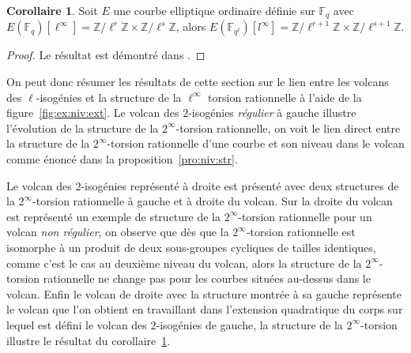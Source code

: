\documentclass[10pt,a4paper]{book}
\theoremstyle{plain}
\theoremstyle{definition}
\theoremstyle{definition}
\theoremstyle{definition}
\newtheorem{cor}[thm]{Corollaire}
\theoremstyle{definition}
\theoremstyle{definition}
\theoremstyle{remark}
\theoremstyle{remark}
\theoremstyle{definition}
\begin{document}
\begin{cor} 
\label{cor:struct:ext}
Soit $E$ une courbe elliptique ordinaire définie sur $\mathbb{F}_q$ avec $E(\mathbb{F}_{q})[\ell^{\infty}]=\mathbb{Z} / \ell^{r} \mathbb{Z} \times \mathbb{Z} / \ell^{s} \mathbb{Z}$, alors $E(\mathbb{F}_{q^{\ell}})[l^{\infty}]=\mathbb{Z} / \ell^{r+1} \mathbb{Z} \times \mathbb{Z} / \ell^{s+1} \mathbb{Z}$.
\end{cor}

\begin{proof}
Le résultat est démontré dans \cite[§5.3.1]{Ionica2010}.
\end{proof}

On peut donc résumer les résultats de cette section sur le lien entre les 
volcans des $\ell$-isogénies et la structure de la $\ell^{\infty}$ torsion 
rationnelle à l'aide de la figure~\ref{fig:ex:niv:ext}. Le volcan des 
$2$-isogénies \emph{régulier} à gauche illustre l'évolution de la structure de
la $2^{\infty}$-torsion rationnelle, on voit le lien direct entre la 
structure de la $2^{\infty}$-torsion rationnelle d'une courbe et son niveau 
dans le volcan comme énoncé dans la proposition~\ref{pro:niv:str}. 

Le volcan des $2$-isogénies représenté à droite est présenté avec deux
structures de la $2^{\infty}$-torsion rationnelle à gauche et à droite du 
volcan. Sur la droite du volcan est représenté un exemple de structure de la 
$2^{\infty}$-torsion rationnelle pour un volcan \emph{non régulier}, on observe
que dès que la $2^{\infty}$-torsion rationnelle est isomorphe à un produit de 
deux sous-groupes cycliques de tailles identiques, comme c'est le cas au 
deuxième niveau du volcan, alors la structure de la $2^{\infty}$-torsion 
rationnelle ne change pas pour les courbes situées au-dessus dans le volcan. 
Enfin le volcan de droite avec la structure montrée à sa gauche représente le 
volcan que l'on obtient en travaillant dans l'extension quadratique du corps 
sur lequel est défini le volcan des $2$-isogénies de gauche, la structure de 
la $2^{\infty}$-torsion illustre le résultat du corollaire~\ref{cor:struct:ext}.
\end{document}

